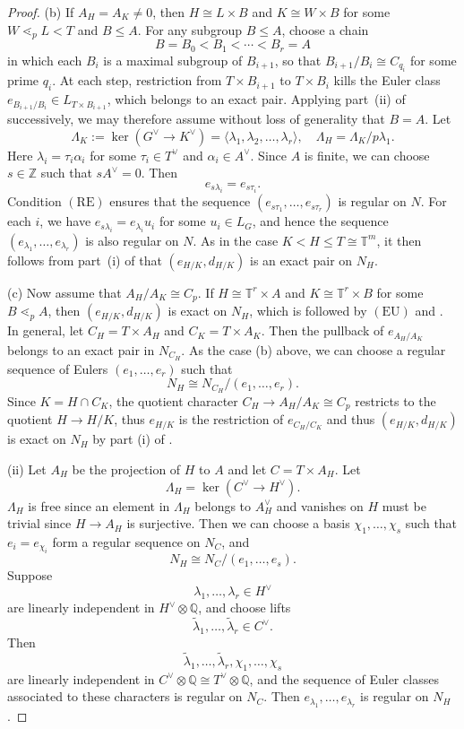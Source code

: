 \documentclass[11pt,reqno]{amsart}
\newcommand{\bbT}{\mathbb T}
\newcommand{\lessdotp}{\mathrel{\lessdot_p}}
\begin{document}
\begin{proof}
  (b) If $A_H=A_K\neq 0$, then $H\cong L\times B$ and $K\cong  W\times B$ for some $W\lessdotp L< T$ and $B\leq A$. For any subgroup $B\leq A$, choose a chain
  \[
  B=B_0<B_1<\cdots<B_r=A
  \]
  in which each $B_i$ is a maximal subgroup of $B_{i+1}$, so that $B_{i+1}/B_i\cong C_{q_i}$ for some prime $q_i$. At each step, restriction from $T\times B_{i+1}$ to $T\times B_i$ kills the Euler class $e_{B_{i+1}/B_i}\in L_{T\times B_{i+1}}$, which belongs to an exact pair. Applying part~\textup{(ii)} of  successively, we may therefore assume without loss of generality that $B=A$. Let 
  $$\Lambda_{K}:=\ker (G^\vee \to {K}^\vee)=\langle \lambda_1,\lambda_2,\dots,\lambda_r\rangle, \quad \Lambda_{H}=\Lambda_{K}/p\lambda_1.$$ 
  Here $\lambda_i=\tau_i\alpha_i$ for some $\tau_i\in T^\vee$ and $\alpha_i\in A^\vee$. 
  Since $A$ is finite, we can choose $s\in \mathbb Z$ such that $s A^\vee=0$. Then $$e_{s\lambda_i}=e_{s\tau_i}.$$
  Condition $(\mathrm{RE})$ ensures that the sequence $(e_{s\tau_1},\dots,e_{s\tau_r})$ is regular on $N$. For each $i$, we have $e_{s\lambda_i}=e_{\lambda_i}u_i$ for some $u_i\in L_G$, and hence the sequence $(e_{\lambda_1},\dots,e_{\lambda_r})$ is also regular on $N$. As in the case $K<H\leq T\cong\bbT^m$, it then follows from part~\textup{(i)} of  that $(e_{H/K},d_{H/K})$ is an exact pair on $N_H$.

  (c) Now assume that $A_H/A_K\cong C_p$. If $H\cong \bbT^r\times A$ and $K\cong \bbT^r\times B$ for some $B\lessdotp A$, then $(e_{H/K},d_{H/K})$ is exact on $N_H$, which is followed by $(\mathrm{EU})$ and . In general, let $C_H=T\times A_H$ and $C_K=T\times A_K$. Then the pullback of $e_{A_H/A_K}$ belongs to an exact pair in $N_{C_H}$. As the case (b) above, we can choose a regular sequence of Eulers $(e_1,\dots,e_r)$ such that 
  \[
  N_H\cong N_{C_H}/(e_1,\dots, e_r).
  \]
  Since $K=H\cap C_K$, the quotient character $C_H \to A_H/A_K\cong C_p$ restricts to the quotient $H\to H/K$, thus $e_{H/K}$ is the restriction of $e_{C_H/C_K}$ and thus $(e_{H/K},d_{H/K})$ is exact on $N_H$ by part (i) of .

  (ii) Let $A_H$ be the projection of $H$ to $A$ and let $C=T\times A_H$. Let 
  \[
  \Lambda_H =\ker (C^\vee\to H^\vee).
  \]
  $\Lambda_H$ is free since an element in $\Lambda_H$ belongs to \(A_H^\vee\) and vanishes on $H$ must be trivial since $H\to A_H$ is surjective. Then we can choose a basis $\chi_1,\dots, \chi_s$ such that $e_i=e_{\chi_i}$ form a regular sequence on $N_C$, and 
  \[
  N_H \cong N_C/(e_1,\dots, e_s).
  \]
  Suppose
  \[
  \lambda_1,\ldots,\lambda_r\in H^\vee
  \]
  are linearly independent in \(H^\vee\otimes\mathbb Q\), and choose lifts
  \[
  \widetilde\lambda_1,\ldots,\widetilde\lambda_r\in C^\vee.
  \]
  Then
  \[
  \widetilde\lambda_1,\ldots,\widetilde\lambda_r, \chi_1,\ldots,\chi_s
  \]
  are linearly independent in $ C^\vee\otimes\mathbb Q\cong T^\vee\otimes\mathbb Q$, and the sequence of Euler classes associated to these characters is regular on $N_C$. Then $e_{\lambda_1}, \dots, e_{\lambda_r}$ is regular on $N_H$. 
\end{proof}
\end{document}
